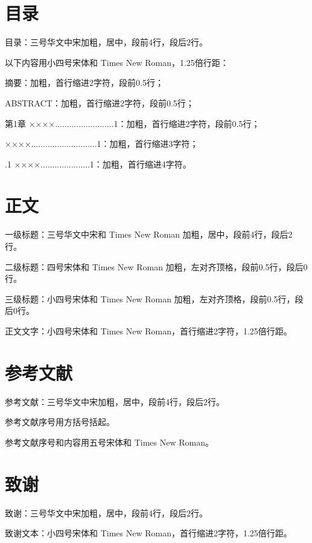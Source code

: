 \section{目录}
\par 目录：三号华文中宋加粗，居中，段前4行，段后2行。
\par 以下内容用小四号宋体和 Times New Roman，1.25倍行距：
\par 摘要：加粗，首行缩进2字符，段前0.5行；
\par ABSTRACT：加粗，首行缩进2字符，段前0.5行；
\par 第1章 ××××.........................1：加粗，首行缩进2字符，段前0.5行；
\par {} ××××............................1：加粗，首行缩进3字符；
\par {}.1 ××××.....................1：加粗，首行缩进4字符。

\section{正文}
\par 一级标题：三号华文中宋和 Times New Roman 加粗，居中，段前4行，段后2行。
\par 二级标题：四号宋体和 Times New Roman 加粗，左对齐顶格，段前0.5行，段后0行。
\par 三级标题：小四号宋体和 Times New Roman 加粗，左对齐顶格，段前0.5行，段后0行。
\par 正文文字：小四号宋体和 Times New Roman，首行缩进2字符，1.25倍行距。

\section{参考文献}
\par 参考文献：三号华文中宋加粗，居中，段前4行，段后2行。
\par 参考文献序号用方括号括起。
\par 参考文献序号和内容用五号宋体和 Times New Roman。

\section{致谢}
\par 致谢：三号华文中宋加粗，居中，段前4行，段后2行。
\par 致谢文本：小四号宋体和 Times New Roman，首行缩进2字符，1.25倍行距。
